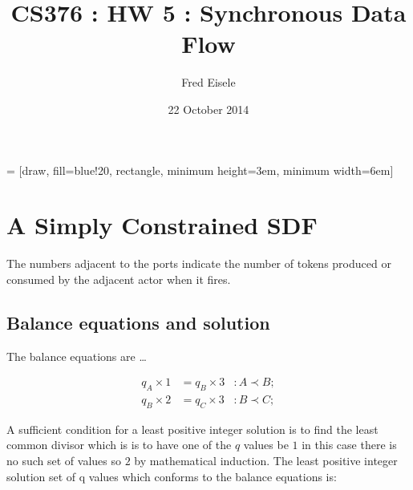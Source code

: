 \documentclass{article}
\title{CS376 : HW 5 : Synchronous Data Flow}
\author{Fred Eisele }
\date{22 October 2014}
\begin{document}
\renewcommand{\thesection}{\arabic{section}}
\renewcommand{\thesubsection}{\alph{subsection}}

\newcommand*\cv[3][]{
    \begin{pmatrix}\ifx\relax#1\relax\else#1\\\fi#2\\#3\end{pmatrix}
}

\maketitle

 = [draw, fill=blue!20, rectangle,
    minimum height=3em, minimum width=6em]

\setcounter{section}{5}

\section{A Simply Constrained SDF}


The numbers adjacent to the ports indicate the number of tokens
produced or consumed by the adjacent actor when it fires.

\subsection{Balance equations and solution}

The balance equations are \ldots

\begin{align}
q_A \times 1 & = q_B \times 3 &: A \prec B ; \\
q_B \times 2 & = q_C \times 3 &: B \prec C ;
\end{align}

A sufficient condition for a least positive integer solution
is to find the least common divisor which is
is to have one of the $q$ values be $1$ in this case there
is no such set of values so $2$ by mathematical induction.
The least positive integer solution set of q values
which conforms to the balance equations is:
\end{document}
